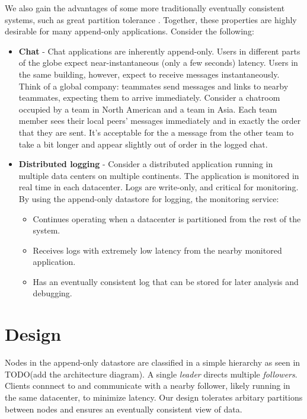 \documentclass[11pt,english,twocolumn]{article}
\begin{document}
We also gain the advantages of some more traditionally eventually consistent
systems, such as great partition tolerance \cite{dynamo}. Together, these
properties are highly desirable for many append-only applications. Consider the
following:

\begin{itemize}
	\item \textbf{Chat} - Chat applications are inherently append-only. Users
		in different parts of the globe expect near-instantaneous (only
		a few seconds) latency. Users in the same building, however,
		expect to receive messages instantaneously. Think of a global
		company: teammates send messages and links to nearby teammates,
		expecting them to arrive immediately. Consider a chatroom
		occupied by a team in North American and a team in Asia. Each
		team member sees their local peers' messages immediately and in
		exactly the order that they are sent. It's acceptable for the a
		message from the other team to take a bit longer and appear
		slightly out of order in the logged chat.
	\item \textbf{Distributed logging} - Consider a distributed application
		running in multiple data centers on multiple continents. The
		application is monitored in real time in each datacenter. Logs
		are write-only, and critical for monitoring. By using the
		append-only datastore for logging, the monitoring service:
		\begin{itemize}
			\item Continues operating when a datacenter is
				partitioned from the rest of the system.
			\item Receives logs with extremely low latency from the
				nearby monitored application.
			\item Has an eventually consistent log that can be
				stored for later analysis and debugging.
		\end{itemize}
\end{itemize}

\section{Design}
Nodes in the append-only datastore are classified in a simple hierarchy as seen
in TODO(add the architecture diagram). A single \textit{leader} directs multiple
\textit{followers}. Clients connnect to and communicate with a nearby follower,
likely running in the same datacenter, to minimize latency. Our design tolerates
arbitary partitions between nodes and ensures an eventually consistent view of
data.
\end{document}
